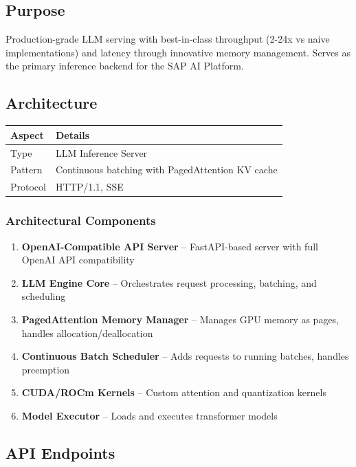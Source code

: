 \documentclass[11pt,a4paper]{article}
\begin{document}
\subsection{Purpose}

Production-grade LLM serving with best-in-class throughput (2-24x vs naive implementations) and latency through innovative memory management. Serves as the primary inference backend for the SAP AI Platform.

\subsection{Architecture}

\begin{tabular}{@{}L{4cm}L{10cm}@{}}
\toprule
\textbf{Aspect} & \textbf{Details} \\
\midrule
Type & LLM Inference Server \\
Pattern & Continuous batching with PagedAttention KV cache \\
Protocol & HTTP/1.1, SSE \\
\bottomrule
\end{tabular}

\subsubsection{Architectural Components}

\begin{enumerate}[noitemsep]
    \item \textbf{OpenAI-Compatible API Server} -- FastAPI-based server with full OpenAI API compatibility
    \item \textbf{LLM Engine Core} -- Orchestrates request processing, batching, and scheduling
    \item \textbf{PagedAttention Memory Manager} -- Manages GPU memory as pages, handles allocation/deallocation
    \item \textbf{Continuous Batch Scheduler} -- Adds requests to running batches, handles preemption
    \item \textbf{CUDA/ROCm Kernels} -- Custom attention and quantization kernels
    \item \textbf{Model Executor} -- Loads and executes transformer models
\end{enumerate}

\subsection{API Endpoints}
\end{document}
